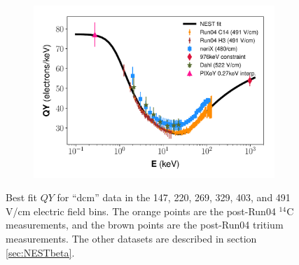 \begin{figure}[h!]
\begin{subfigure}{0.5\textwidth}
  \caption{}
\end{subfigure}%
\begin{subfigure}{0.5\textwidth}
  \centering
  \includegraphics[width=\textwidth]{Figures/Yields_fit_old/NEST_fit_491Vcm_old_dcm.pdf}
  \caption{}
\end{subfigure}
\caption{Best fit $QY$ for ``dcm'' data in the 147, 220, 269, 329, 403, and 491 V/cm electric field bins. The orange points are the post-Run04 $^{14}$C measurements, and the brown points are the post-Run04 tritium measurements. The other datasets are described in section \ref{sec:NESTbeta}.}
\label{fig:dcm_prelim_QY2}
\end{figure}

\clearpage

